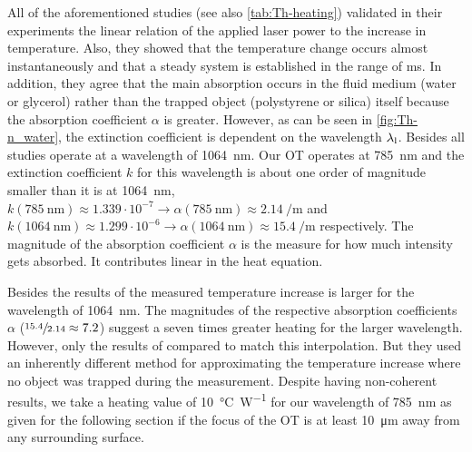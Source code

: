 All of the aforementioned studies (see also \cref{tab:Th-heating}) validated in 
their experiments the linear relation of the applied laser power to the 
increase in temperature. Also, they showed that the temperature change occurs 
almost instantaneously and that a steady system is established in the range of 
\si{\ms}. In addition, they agree that the main absorption occurs in the fluid 
medium (water or glycerol) rather than the trapped object (polystyrene or 
silica) itself because the absorption coefficient $\alpha$ is greater. However, 
as can be seen in \cref{fig:Th-n_water}, the extinction coefficient is 
dependent on the wavelength $\lambda_{\mathrm{l}}$. Besides \cite{Moreau2015} all studies 
operate at a wavelength of \SI{1064}{\nm}. Our OT operates at \SI{785}{\nm} and 
the extinction coefficient $k$ for this wavelength is about one order of 
magnitude smaller than it is at \SI{1064}{\nm},
$k(\SI{785}{\nm}) \approx 1.339\cdot 10^{-7} \rightarrow \alpha(\SI{785}{\nm}) 
\approx \SI{2.14}{\per\meter} $ and $k(\SI{1064}{\nm}) \approx 1.299\cdot 
10^{-6} \rightarrow \alpha(\SI{1064}{\nm}) \approx \SI{15.4}{\per\meter} $ 
respectively. The magnitude of the absorption coefficient $\alpha$ is the 
measure for how much intensity gets absorbed. It contributes linear in the heat 
equation.

Besides the results of  the measured temperature increase 
is larger for the wavelength of \SI{1064}{\nm}. The magnitudes of the 
respective absorption coefficients $\alpha$ ($\sfrac{15.4}{2.14}\approx 7.2$) 
suggest a seven times greater heating for the larger wavelength. However, only 
the results of  compared to  match this 
interpolation. But they used an inherently different method for approximating 
the temperature increase where no object was trapped during the measurement. 
Despite having non-coherent results, we take a heating value of 
\SI{10}{\degreeCelsius\per\watt} for our wavelength of \SI{785}{\nm} as given 
for the following section if the focus of the OT is at least \SI{10}{\um} away 
from any surrounding surface.

